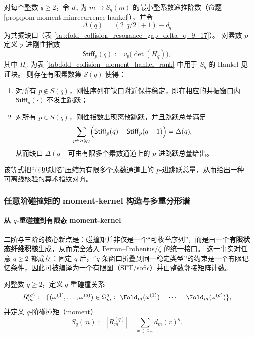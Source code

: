 \begin{conjecture}[刚性指数跳跃的有限素数支撑与缺陷量子化对齐]\label{conj:pom-stiffness-jump-quantized-defect}
对每个整数 \(q\ge 2\)，令 \(d_q\) 为 \(m\mapsto S_q(m)\) 的最小整系数递推阶数（命题 \ref{prop:pom-moment-minrecurrence-hankel}），并令
\[
\Delta(q):=(2\lfloor q/2\rfloor+1)-d_q
\]
为共振缺口（表 \ref{tab:fold_collision_resonance_gap_delta_q_9_17}）。
对素数 \(p\) 定义 \(p\)-进刚性指数
\[
\mathsf{Stiff}_p(q):=v_p\!\bigl(\det(H_q)\bigr),
\]
其中 \(H_q\) 为表 \ref{tab:fold_collision_moment_hankel_rank} 中用于 \(S_q\) 的 Hankel 见证块。
则存在有限素数集 \(S(q)\) 使得：
\begin{enumerate}
  \item 对所有 \(p\notin S(q)\)，刚性序列在缺口附近保持稳定，即在相应的共振窗口内 \(\mathsf{Stiff}_p(\cdot)\) 不发生跳跃；
  \item 对所有 \(p\in S(q)\)，刚性指数出现离散跳跃，并且跳跃总量满足
  \[
  \sum_{p\in S(q)}\Bigl(\mathsf{Stiff}_p(q)-\mathsf{Stiff}_p(q-1)\Bigr)=\Delta(q),
  \]
  从而缺口 \(\Delta(q)\) 可由有限多个素数通道上的 \(p\)-进跳跃总量给出。
\end{enumerate}
该等式把“可见缺陷”压缩为有限多个素数通道上的 \(p\)-进跳跃总量，从而给出一种可离线核验的算术指纹对齐。
\end{conjecture}



\subsubsection{任意阶碰撞矩的 moment-kernel 构造与多重分形谱}\label{subsec:pom-moment-general}

\paragraph{从 \texorpdfstring{$q$}{q}-重碰撞到有限态 moment-kernel}
二阶与三阶的核心新点是：碰撞矩并非仅是一个“可枚举序列”，而是由一个\textbf{有限状态纤维积核}生成，从而完全落入 Perron--Frobenius/\(\zeta\) 的统一接口。
这一事实对任意 \(q\ge 2\) 都成立：固定 \(q\) 后，“\(q\) 条窗口折叠到同一稳定类型”的约束是一个有限记忆条件，因此可被编译为一个有限图（SFT/sofic）并由整数邻接矩阵计数。

\begin{definition}\label{def:pom-moment-q}
对整数 \(q\ge 2\)，定义 \(q\)-重碰撞关系
$$
R_m^{(q)}:=
\{(\omega^{(1)},\dots,\omega^{(q)})\in\Omega_m^q:\ \Fold_m(\omega^{(1)})=\cdots=\Fold_m(\omega^{(q)})\},
$$
并定义 \(q\)-阶碰撞矩（moment）
$$
S_q(m):=|R_m^{(q)}|=\sum_{x\in X_m} d_m(x)^q.
$$
\end{definition}

